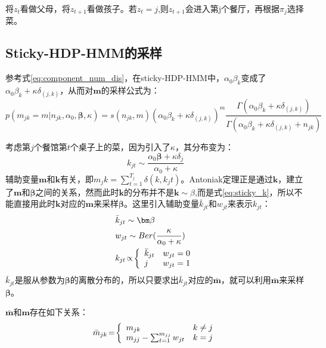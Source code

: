 将$z_t$看做父母，将$z_{t+1}$看做孩子。若$z_t = j$,则$z_{t+1}$会进入第j个餐厅，再根据$\pi_j$选择菜。

\subsection{Sticky-HDP-HMM的采样}

参考式\eqref{eq:component_num_dis}，在sticky-HDP-HMM中，$\alpha_0\beta_k$变成了$\alpha_0\beta_k + \kappa \delta_{(j,k)}$，从而对${\bm m}$的采样公式为：
\begin{equation}
p(m_{jk} = m|n_{jk},\alpha_0,{\bm \beta},\kappa) = s(n_{jk},m)(\alpha_0\beta_k+ \kappa \delta_{(j,k)})^m\frac{\Gamma(\alpha_0\beta_k + \kappa \delta_{(j,k)})}{\Gamma(\alpha_0\beta_k+ \kappa \delta_{(j,k)} + n_{jk})} 
\end{equation}

考虑第$j$个餐馆第$t$个桌子上的菜，因为引入了$\kappa$，其分布变为：
\begin{equation}
k_{jt} \sim \frac{\alpha_0{\bm \beta} + \kappa \delta_j}{\alpha_0 + \kappa}\label{eq:sticky_k}
\end{equation}
辅助变量${\bm m}$和${\bm k}$有关，即$m_jk = \sum_{t=1}^{T_j}{\delta(k,k_jt)}$。Antoniak定理正是通过${\bm k}$，建立了${\bm m}$和${\bm \beta}$之间的关系，然而此时${\bm k}$的分布并不是${\bm k} \sim {\beta}$,而是式\eqref{eq:sticky_k}，所以不能直接用此时${\bm k}$对应的${\bm m}$来采样${\bm \beta}$。这里引入辅助变量$\bar{k}_{jt}$和$w_{jt}$来表示$k_{jt}$：
\begin{equation}
\begin{split}
& \bar{k}_{jt}  \sim {\bm \beta}\\
& w_{jt} \sim Ber(\frac{\kappa}{\alpha_0+\kappa})\\
& k_{jt}\!\propto\!\left\{
\begin{array}{ll}
\bar{k}_{jt} & w_{jt} = 0\\
j  & w_{jt} = 1\\
\end{array}
\right.\vspace{-2pt}
\end{split}
\label{hdp_inf_aux_w}
\end{equation}
$\bar{k}_{jt}$是服从参数为${\bm \beta}$的离散分布的，所以只要求出$\bar{k}_{jt}$对应的$\bar{\bm m}$，就可以利用$\bar{\bm m}$来采样${\bm \beta}$。

$\bar{\bm m}$和${\bm m}$存在如下关系：
\begin{equation}\vspace{-2pt}
\bar{m}_{jk}\!=\!\left\{
\begin{array}{lll}
m_{jk} & k \neq j\\
m_{jj} - \sum_{t = 1}^{m_{jj}}w_{jt} & k=j\\
\end{array}
\right.\vspace{-2pt}
\end{equation}

